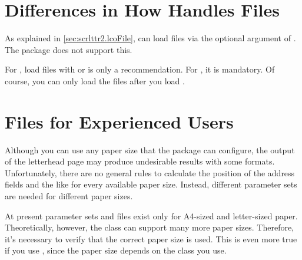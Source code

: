\section{Differences in How  Handles  Files}
\BeginIndexGroup
{}

As explained in
\autoref{sec:scrlttr2.lcoFile},  can load  files via
the optional argument of . The  package
does not support this.

\begin{Declaration}
\end{Declaration}
For , load  files with
 or
 is only a recommendation. For
, it is mandatory. Of course, you can only load the
 files after you load .
%
\EndIndexGroup
%
\EndIndexGroup
\fi


\section{ Files for Experienced Users}
\BeginIndexGroup
{}

\BeginIndexGroup%
%
Although you can use any paper size that the
\hyperref[cha:typearea]{}%
 package can configure, the output of the letterhead
page may produce undesirable results with some formats. Unfortunately, there
are no general rules to calculate the position of the address fields and the
like for every available paper size. Instead, different parameter sets are
needed for different paper sizes.%


At present parameter sets and  files exist only for A4-sized and
letter-sized paper. Theoretically, however, the  class can
support many more paper sizes. Therefore, it's necessary to verify that the
correct paper size is used. This is even more true if you use
, since the paper size depends on the class you use.

